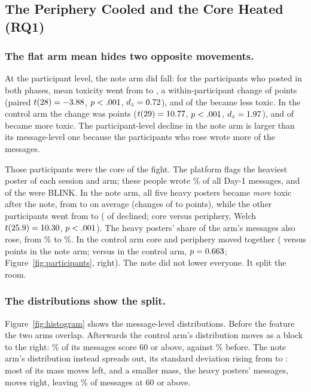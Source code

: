 \documentclass[manuscript,screen,review,anonymous]{acmart}
\begin{document}
\subsection{The Periphery Cooled and the Core Heated (RQ1)}

\subsubsection{The flat arm mean hides two opposite movements.}
At the participant level, the note arm did fall: for the \StatexptPairN{}
participants who posted in both phases, mean toxicity went from
\StatexptPrePartM{} to \StatexptPostPartM{}, a within-participant change of
\StatexptPairDiff{} points (paired $t(28)=-3.88$,
$p<.001$, $d_z=0.72$), and \StatexptNDeclined{} of the
\StatexptPairN{} became less toxic. In the control arm the change was
\StatctrlPairDiff{} points ($t(29)=10.77$,
$p<.001$, $d_z=1.97$), and \StatctrlNRose{} of
\StatctrlPairN{} became more toxic. The participant-level decline in the
note arm is larger than its message-level one because the participants who
rose wrote more of the messages.

Those participants were the core of the fight. The platform flags the
heaviest poster of each session and arm; these \StatheavyTotalN{} people
wrote \StatheavyMsgPct\% of all Day-1 messages, and \StatheavyBlinkN{} of
the \StatheavyTotalN{} were BLINK. In the note arm, all five heavy posters
became \emph{more} toxic after the note, from \StatexptHeavyPreM{} to
\StatexptHeavyPostM{} on average (changes of \StatexptHeavyDiffMin{} to
\StatexptHeavyDiffMax{} points), while the other \StatexptPeriN{}
participants went from \StatexptPeriPreM{} to \StatexptPeriPostM{}
(\StatexptPeriNDeclined{} of \StatexptPeriN{} declined; core versus
periphery, Welch $t(25.9)=10.30$,
$p<.001$). The heavy posters' share of the arm's messages
also rose, from \StatexptHeavySharePre\% to \StatexptHeavySharePost\%. In
the control arm core and periphery moved together (\StatexptHeavyDiff{}
versus \StatexptPeriDiff{} points in the note arm; \StatctrlHeavyDiff{}
versus \StatctrlPeriDiff{} in the control arm, $p=0.663$;
Figure~\ref{fig:participants}, right). The note did not lower everyone. It
split the room.

\subsubsection{The distributions show the split.}
Figure~\ref{fig:histogram} shows the message-level distributions. Before the
feature the two arms overlap. Afterwards the control arm's distribution
moves as a block to the right: \StatctrlPostHighPct\% of its messages score
60 or above, against \StatctrlPreHighPct\% before. The note arm's
distribution instead spreads out, its standard deviation rising from
\StatexptPreSD{} to \StatexptPostSD: most of its mass moves left, and a
smaller mass, the heavy posters' messages, moves right, leaving
\StatexptPostHighPct\% of messages at 60 or above.
\end{document}
